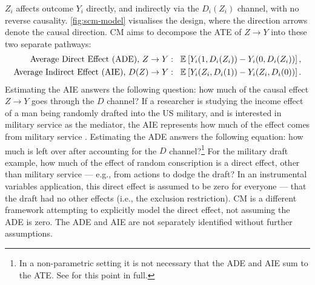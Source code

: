$Z_i$ affects outcome $Y_i$ directly, and indirectly via the $D_i(Z_i)$ channel, with no reverse causality.
\autoref{fig:scm-model} visualises the design, where the direction arrows denote the causal direction.
CM aims to decompose the ATE of $Z \to Y$ into these two separate pathways:
\begin{align*}
    \text{Average Direct Effect (ADE), } Z \to Y: \;\;\;&
        \mathbb{E}_{} \left[ Y_i(1, D_i(Z_i)) - Y_i(0, D_i(Z_i)) \right], \\
    \text{Average Indirect Effect (AIE), } D(Z) \to Y: \;\;\;&
            \mathbb{E}_{} \left[ Y_i(Z_i, D_i(1)) - Y_i(Z_i, D_i(0)) \right] .
\end{align*}
Estimating the AIE answers the following question: how much of the causal effect $Z \to Y$ goes through the $D$ channel?
If a researcher is studying the income effect of a man being randomly drafted into the US military, and is interested in military service as the mediator, the AIE represents how much of the effect comes from military service \citep{angrist1990lifetime}.
Estimating the ADE answers the following equation: how much is left over after accounting for the $D$ channel?\footnote{
    In a non-parametric setting it is not necessary that the ADE and AIE sum to the ATE.
    See \cite{imai2010identification} for this point in full.
}
For the military draft example, how much of the effect of random conscription is a direct effect, other than military service --- e.g., from actions to dodge the draft?
In an instrumental variables application, this direct effect is assumed to be zero for everyone --- that the draft had no other effects (i.e., the exclusion restriction).
CM is a different framework attempting to explicitly model the direct effect, not assuming the ADE is zero.
The ADE and AIE are not separately identified without further assumptions.


